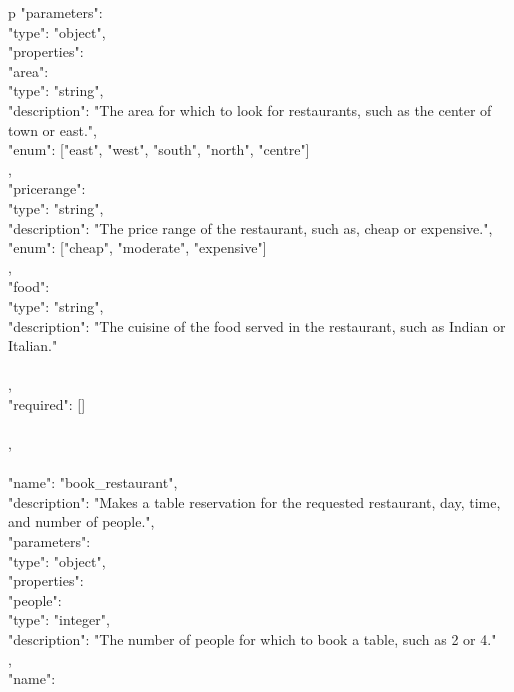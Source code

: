 \begin{table*}
\begin{tabular}{p\linewidth}
{        "parameters": {\\
            "type": "object",\\
            "properties": {\\
                "area": {\\
                    "type": "string",\\
                    "description": "The area for which to look for restaurants, such as the center of town or east.",\\
                    "enum": ["east", "west", "south", "north", "centre"]\\
                },\\
                "pricerange": {\\
                    "type": "string",\\
                    "description": "The price range of the restaurant, such as, cheap or expensive.",\\
                    "enum": ["cheap", "moderate", "expensive"]\\
                },\\
                "food": {\\
                    "type": "string",\\
                    "description": "The cuisine of the food served in the restaurant, such as Indian or Italian."\\
                }\\
            },\\
            "required": []\\
        }\\
    },\\
    {\\
     	"name": "book\_restaurant",\\
	    "description": "Makes a table reservation for the requested restaurant, day, time, and number of people.",\\
	    "parameters": {\\
            "type": "object",\\
            "properties": {\\
		        "people": {\\
                    "type": "integer",\\
                    "description": "The number of people for which to book a table, such as 2 or 4."\\
		        },\\
                "name": {\\
}}}}
\end{tabular}
\end{table*}
